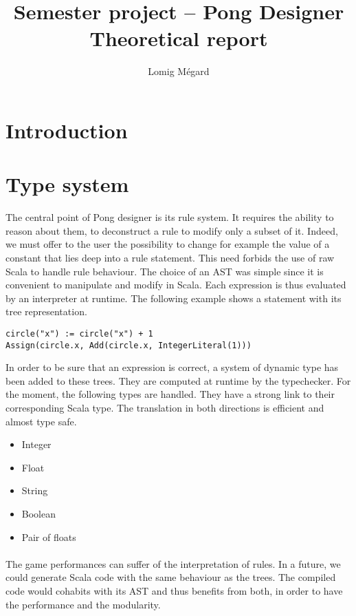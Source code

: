 \documentclass[11pt,a4paper]{article}
\title{Semester project -- Pong Designer\\Theoretical report}
\author{Lomig Mégard}
\begin{document}
\maketitle

\section{Introduction}

\section{Type system}
The central point of Pong designer is its rule system. It requires the ability to reason about them, to deconstruct a rule to modify only a subset of it. Indeed, we must offer to the user the possibility to change for example the value of a constant that lies deep into a rule statement. This need forbids the use of raw Scala to handle rule behaviour. The choice of an AST was simple since it is convenient to manipulate and modify in Scala. Each expression is thus evaluated by an interpreter at runtime. The following example shows a statement with its tree representation.
\begin{lstlisting}
circle("x") := circle("x") + 1
Assign(circle.x, Add(circle.x, IntegerLiteral(1)))
\end{lstlisting}

In order to be sure that an expression is correct, a system of dynamic type has been added to these trees. They are computed at runtime by the typechecker. For the moment, the following types are handled. They have a strong link to their corresponding Scala type. The translation in both directions is efficient and almost type safe.
\begin{itemize}[noitemsep,topsep=2pt,parsep=1pt,partopsep=1pt]
\item Integer
\item Float
\item String
\item Boolean
\item Pair of floats
\end{itemize}

\paragraph*{}
The game performances can suffer of the interpretation of rules. In a future, we could generate Scala code with the same behaviour as the trees. The compiled code would cohabits with its AST and thus benefits from both, in order to have the performance and the modularity.
\end{document}
